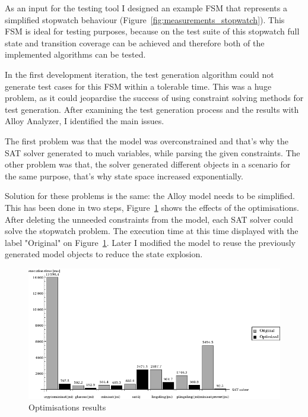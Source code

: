 As an input for the testing tool I designed an example FSM that represents a simplified stopwatch behaviour (Figure~\ref{fig:measurements_stopwatch}). This FSM is ideal for testing purposes, because on the test suite of this stopwatch full state and transition coverage can be achieved and therefore both of the implemented algorithms can be tested.

In the first development iteration, the test generation algorithm could not generate test cases for this FSM within a tolerable time. This was a huge problem, as it could jeopardise the success of using constraint solving methods for test generation. After examining the test generation process and the results with Alloy Analyzer, I identified the main issues.

The first problem was that the model was overconstrained and that's why the SAT solver generated to much variables, while parsing the given constraints. The other problem was that, the solver generated different objects in a scenario for the same purpose, that's why state space increased exponentially.

Solution for these problems is the same: the Alloy model needs to be simplified. This has been done in two steps,  Figure~\ref{fig:measurements_optimalizations} shows the effects of the optimisations. After deleting the unneeded constraints from the model, each SAT solver could solve the stopwatch problem. The execution time at this time displayed with the label "Original" on Figure~\ref{fig:measurements_optimalizations}. Later I modified the model to reuse the previously generated model objects to reduce the state explosion.

\begin{figure}[htp]
\centering
\includegraphics[scale=0.55]{figures/measurements_optimalizations}
\caption{Optimisations results}
\label{fig:measurements_optimalizations}
\end{figure}

